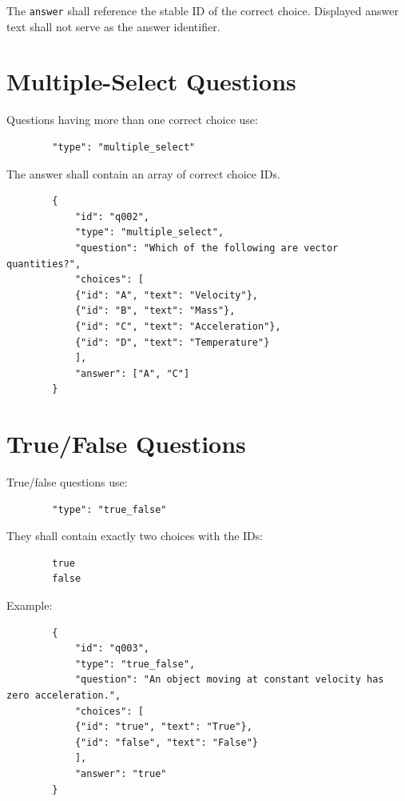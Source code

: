 \documentclass[11pt]{article}
\begin{document}
	The \texttt{answer} shall reference the stable ID of the correct choice.
	Displayed answer text shall not serve as the answer identifier.
	
	\section{Multiple-Select Questions}
	
	Questions having more than one correct choice use:
	
	\begin{lstlisting}
		"type": "multiple_select"
	\end{lstlisting}
	
	The answer shall contain an array of correct choice IDs.
	
	\begin{lstlisting}
		{
			"id": "q002",
			"type": "multiple_select",
			"question": "Which of the following are vector quantities?",
			"choices": [
			{"id": "A", "text": "Velocity"},
			{"id": "B", "text": "Mass"},
			{"id": "C", "text": "Acceleration"},
			{"id": "D", "text": "Temperature"}
			],
			"answer": ["A", "C"]
		}
	\end{lstlisting}
	
	\section{True/False Questions}
	
	True/false questions use:
	
	\begin{lstlisting}
		"type": "true_false"
	\end{lstlisting}
	
	They shall contain exactly two choices with the IDs:
	
	\begin{lstlisting}
		true
		false
	\end{lstlisting}
	
	Example:
	
	\begin{lstlisting}
		{
			"id": "q003",
			"type": "true_false",
			"question": "An object moving at constant velocity has zero acceleration.",
			"choices": [
			{"id": "true", "text": "True"},
			{"id": "false", "text": "False"}
			],
			"answer": "true"
		}
	\end{lstlisting}
	
\end{document}
